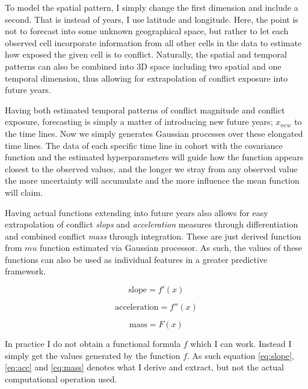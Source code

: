 \documentclass[a4paper]{article}
\begin{document}
To model the spatial pattern, I simply change the first dimension and include a second. That is instead of years, I use latitude and longitude. Here, the point is not to forecast into some unknown geographical space, but rather to let each observed cell incorporate information from all other cells in the data to estimate how exposed the given cell is to conflict. Naturally, the spatial and temporal patterns can also be combined into 3D space including two spatial and one temporal dimension, thus allowing for extrapolation of conflict exposure into future years.\par

Having both estimated temporal patterns of conflict magnitude and conflict exposure, forecasting is simply a matter of introducing new future years; $x_{new}$ to the time lines. Now we simply generates Gaussian processes over these elongated time lines. The data of each specific time line in cohort with the covariance function and the estimated hyperparameters will guide how the function appears closest to the observed values, and the longer we stray from any observed value the more uncertainty will accumulate and the more influence the mean function will claim. 

Having actual functions extending into future years also allows for easy extrapolation of conflict \emph{slops} and \emph{acceleration} measures through differentiation and combined conflict \emph{mass} through integration. These are just derived function from $mu$ function estimated via Gaussian processor. As such, the values of these functions can also be used as individual features in a greater predictive framework.\par 

\[
\text{slope} = f'(x)   \tag{11}  \label{eq:slope}
\]

\[
\text{acceleration} = f''(x) \tag{12}  \label{eq:acc}
\]

\[
\text{mass} = F(x) \tag{13}  \label{eq:mass}
\]

In practice I do not obtain a functional formula $f$ which I can work. Instead I simply get the values generated by the function $f$. As such equation \ref{eq:slope}, \ref{eq:acc} and \ref{eq:mass} denotes what I derive and extract, but not the actual computational operation used.\par
\end{document}
